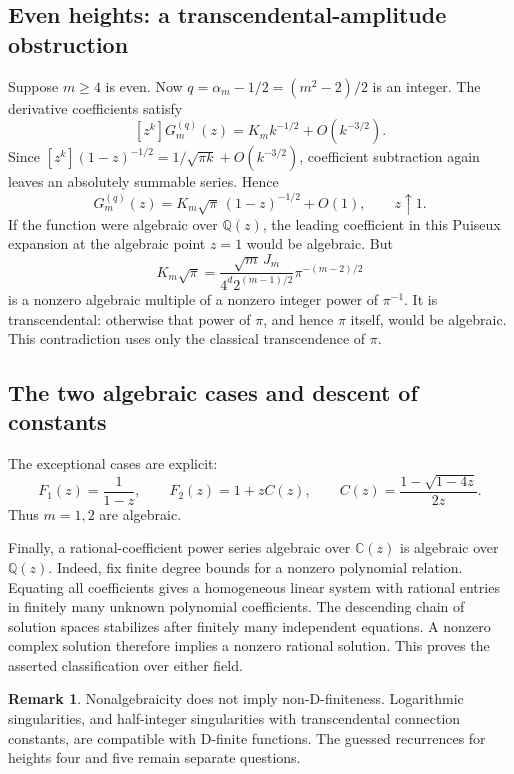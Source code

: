 \documentclass[11pt,letterpaper]{article}
\numberwithin{equation}{section}
\theoremstyle{definition}
\newtheorem{remark}[theorem]{Remark}
\newcommand{\Q}{\mathbb Q}
\newcommand{\1}{\mathbf 1}
\begin{document}
\subsection{Even heights: a transcendental-amplitude obstruction}
Suppose $m\ge4$ is even. Now $q=\alpha_m-1/2=(m^2-2)/2$ is an integer.
The derivative coefficients satisfy
\[
 [z^k]G_m^{(q)}(z)=K_m k^{-1/2}+O(k^{-3/2}).
\]
Since
$[z^k](1-z)^{-1/2}=1/\sqrt{\pi k}+O(k^{-3/2})$, coefficient subtraction
again leaves an absolutely summable series. Hence
\begin{equation}
 G_m^{(q)}(z)=K_m\sqrt\pi\,(1-z)^{-1/2}+O(1),
 \qquad z\uparrow1.
 \label{shr:eq:halfsing}
\end{equation}
If the function were algebraic over $\Q(z)$, the leading coefficient in
this Puiseux expansion at the algebraic point $z=1$ would be algebraic.
But
\begin{equation}
 K_m\sqrt\pi=
 \frac{\sqrt m\,J_m}{4^d2^{(m-1)/2}}
 \pi^{-(m-2)/2}
 \label{shr:eq:amplitude}
\end{equation}
is a nonzero algebraic multiple of a nonzero integer power of $\pi^{-1}$.
It is transcendental: otherwise that power of $\pi$, and hence $\pi$
itself, would be algebraic. This contradiction uses only the classical
transcendence of $\pi$.

\subsection{The two algebraic cases and descent of constants}
The exceptional cases are explicit:
\[
 F_1(z)=\frac1{1-z},\qquad
 F_2(z)=1+zC(z),\qquad
 C(z)=\frac{1-\sqrt{1-4z}}{2z}.
\]
Thus $m=1,2$ are algebraic.

Finally, a rational-coefficient power series algebraic over
$\mathbb C(z)$ is algebraic over $\Q(z)$. Indeed, fix finite degree bounds
for a nonzero polynomial relation. Equating all coefficients gives a
homogeneous linear system with rational entries in finitely many unknown
polynomial coefficients. The descending chain of solution spaces
stabilizes after finitely many independent equations. A nonzero complex
solution therefore implies a nonzero rational solution. This proves the
asserted classification over either field.

\begin{remark}
Nonalgebraicity does not imply non-D-finiteness. Logarithmic singularities,
and half-integer singularities with transcendental connection constants,
are compatible with D-finite functions. The guessed recurrences for
heights four and five remain separate questions.
\end{remark}
\end{document}
